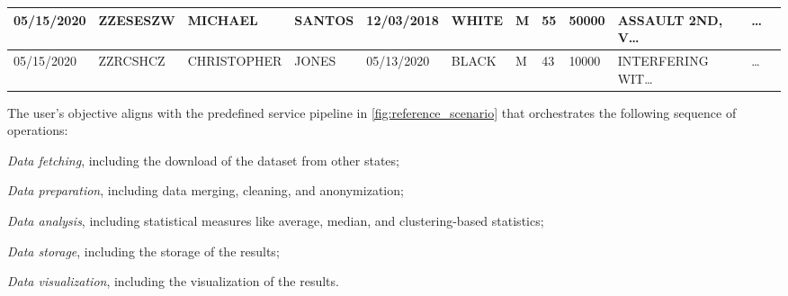 \begin{table*}[!t]
\begin{adjustbox}{max totalsize={.99\linewidth}{\textheight},center}
\begin{tabular}{|l|l|l|l|l|l|l|l|l|l|l|l|}
      05/15/2020             & ZZESESZW    & MICHAEL        & SANTOS         & 12/03/2018   & WHITE         & M               & 55           & 50000         & ASSAULT 2ND, V\dots  & \dots          \\ \hline
      05/15/2020             & ZZRCSHCZ    & CHRISTOPHER    & JONES          & 05/13/2020   & BLACK         & M               & 43           & 10000         & INTERFERING WIT\dots & \dots          \\ \hline
    \end{tabular}
    \egroup
  \end{adjustbox}

\end{table*}

The user's objective aligns with the predefined service pipeline in {\color{OurColor2} \cref{fig:reference_scenario}} that orchestrates the following sequence of operations:
\begin{enumerate*}[label=(\roman*)]
  \item \emph{Data fetching}, including the download of the dataset from other states;
  \item \emph{Data preparation}, including data merging, cleaning, and anonymization;
  \item \emph{Data analysis}, including statistical measures like average, median, and clustering-based statistics;
  \item \emph{Data storage}, including the storage of the results;
  \item \emph{Data visualization}, including the visualization of the results.
\end{enumerate*}

